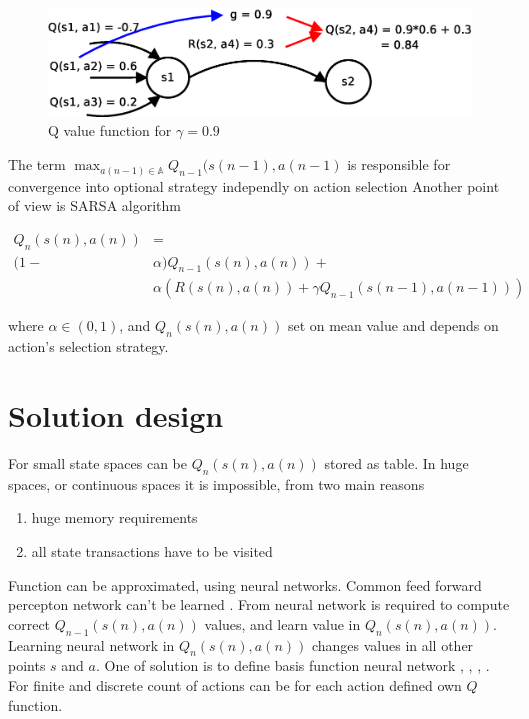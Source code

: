 \documentclass{acmbulletin}
\begin{document}
\begin{figure}[!htb]
\center
\includegraphics[scale=.3]{../diagrams/q_learning_detail.eps}
\caption{Q value function for $\gamma = 0.9$}
\label{img:q_learning}
\end{figure}

The term $\max_{a(n-1) \in \mathbb{A}} Q_{n-1}(s(n-1), a(n-1)$ is responsible
for convergence into optional strategy independly on action selection
Another point of view is SARSA algorithm \cite{bib:sarsa}

\begin{align}
Q_{n}(s(n),a(n)) &= \nonumber \\
 (1-&\alpha)Q_{n-1}(s(n),a(n)) + \nonumber  \\
&\alpha(R(s(n),a(n)) + \gamma Q_{n-1}(s(n-1), a(n-1)))
\label{eq:sarsa}
\end{align}

where $\alpha \in (0, 1)$, and $Q_{n}(s(n),a(n))$ set on
mean value and depends on action's selection strategy.

\section{Solution design}

For small state spaces can be $Q_{n}(s(n),a(n))$ stored as table.
In huge spaces, or continuous spaces it is impossible, from two main reasons
\begin{enumerate}
  \item huge memory requirements
  \item all state transactions have to be visited
\end{enumerate}

Function can be approximated, using neural networks.
Common feed forward percepton network can't be learned \cite{bib:q_fnn_problem}.
From neural network is required to compute correct $Q_{n-1}(s(n),a(n))$ values,
and learn value in $Q_{n}(s(n),a(n))$. Learning neural network in $Q_{n}(s(n),a(n))$
changes values in all other points $s$ and $a$. One of solution is to define
basis function neural network
\cite{bib:aproximation_01},
\cite{bib:aproximation_02},
\cite{bib:aproximation_03},
\cite{bib:aproximation_04}.
For finite and discrete count of actions can
be for each action defined own $Q$ function.
\end{document}
